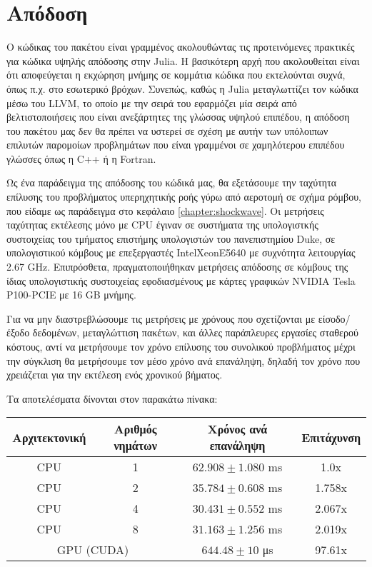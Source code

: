 \section{Απόδοση}

Ο κώδικας του πακέτου είναι γραμμένος ακολουθώντας τις προτεινόμενες πρακτικές για κώδικα υψηλής απόδοσης στην Julia.
Η βασικότερη αρχή που ακολουθείται είναι ότι αποφεύγεται η εκχώρηση μνήμης σε κομμάτια κώδικα που εκτελούνται συχνά, όπως π.χ. στο εσωτερικό βρόχων.
Συνεπώς, καθώς η Julia μεταγλωττίζει τον κώδικα μέσω του LLVM, το οποίο με την σειρά του εφαρμόζει μία σειρά από βελτιστοποιήσεις που είναι ανεξάρτητες της γλώσσας υψηλού επιπέδου, η απόδοση του πακέτου μας δεν θα πρέπει να υστερεί σε σχέση με αυτήν των υπόλοιπων επιλυτών παρομοίων προβλημάτων που είναι γραμμένοι σε χαμηλότερου επιπέδου γλώσσες όπως η C++ ή η Fortran.

Ως ένα παράδειγμα της απόδοσης του κώδικά μας, θα εξετάσουμε την ταχύτητα επίλυσης του προβλήματος υπερηχητικής ροής γύρω από αεροτομή σε σχήμα ρόμβου, που είδαμε ως παράδειγμα στο κεφάλαιο \ref{chapter:shockwave}.
Οι μετρήσεις ταχύτητας εκτέλεσης μόνο με CPU έγιναν σε συστήματα της υπολογιστκής συστοιχείας του τμήματος επιστήμης υπολογιστών του πανεπιστημίου Duke, σε υπολογιστικού κόμβους με επεξεργαστές Intel\textregistered  Xeon\textregistered  E5640 με συχνότητα λειτουργίας 2.67 GHz.
Επιπρόσθετα, πραγματοποιήθηκαν μετρήσεις απόδοσης σε κόμβους της ίδιας υπολογιστικής συστοιχείας εφοδιασμένους με κάρτες γραφικών NVIDIA Tesla P100-PCIE με 16 GB μνήμης.

Για να μην διαστρεβλώσουμε τις μετρήσεις με χρόνους που σχετίζονται με είσοδο/έξοδο δεδομένων, μεταγλώττιση πακέτων, και άλλες παράπλευρες εργασίες σταθερού κόστους, αντί να μετρήσουμε τον χρόνο επίλυσης του συνολικού προβλήματος μέχρι την σύγκλιση θα μετρήσουμε τον μέσο χρόνο ανά επανάληψη, δηλαδή τον χρόνο που χρειάζεται για την εκτέλεση ενός χρονικού βήματος.

Τα αποτελέσματα δίνονται στον παρακάτω πίνακα:

\begin{center}
    \begin{tabular}{|c|c|c|c| }
        \hline
        Αρχιτεκτονική & Αριθμός νημάτων & Χρόνος ανά επανάληψη & Επιτάχυνση \\
        \hline
        CPU & 1 & $62.908 \pm 1.080$ ms & 1.0x \\
        CPU & 2 & $35.784 \pm 0.608$ ms & 1.758x \\
        CPU & 4 & $30.431 \pm 0.552$ ms & 2.067x \\
        CPU & 8 & $31.163 \pm 1.256$ ms & 2.019x \\
        \hline
        \multicolumn{2}{|c|}{GPU (CUDA)} & $644.48 \pm 10 $ μs & 97.61x \\
        \hline
    \end{tabular}
\end{center}

